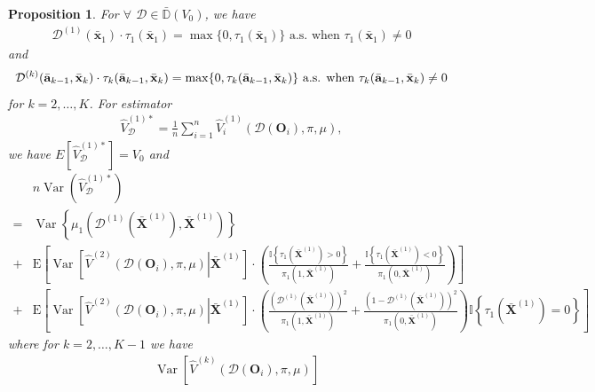 \documentclass[11pt]{article}
\theoremstyle{referenceplain}
\newtheorem{proposition}{Proposition}[section]
\theoremstyle{referencedefinition}
\theoremstyle{referenceremark}
\begin{document}
\begin{proposition}\label{multi-opt-oracle}
    For $\forall$ $\mathcal{D}\in\bar{\mathbb{D}}(V_0)$, we have 
    \begin{align*}
        \mathcal{D}^{(1)}(\bar{\mathbf{x}}_1)\cdot\tau_1(\bar{\mathbf{x}}_1)=\max\{0,\tau_1(\bar{\mathbf{x}}_1)\} \text{ a.s. when }\tau_1(\bar{\mathbf{x}}_1)\neq0
    \end{align*}
    and
    \begin{align*}
         \mathcal{D}^{(k)}(\Bar{\mathbf{a}}_{k-1},\bar{\mathbf{x}}_k)\cdot\tau_k(\Bar{\mathbf{a}}_{k-1},\bar{\mathbf{x}}_k)=\max\{0,\tau_k(\Bar{\mathbf{a}}_{k-1},\bar{\mathbf{x}}_k)\} \text{ a.s. when }\tau_k(\Bar{\mathbf{a}}_{k-1},\bar{\mathbf{x}}_k)\neq0
    \end{align*}
    for $k=2,\dots,K$. For estimator 
    \begin{align*}
        \widehat{V}_{\mathcal{D}}^{(1)*}=\frac{1}{n}\sum_{i=1}^n \widehat{V}_i^{(1)}(\mathcal{D}(\mathbf{O}_i),\pi,\mu),
    \end{align*}
    we have $E[\widehat{V}_{\mathcal{D}}^{(1)*}]=V_0$ and 
    \begin{align*}
        &n\operatorname{Var}\left(\widehat{V}_{\mathcal{D}}^{(1)*}\right)\\
        = &  \operatorname{Var}\left\{\mu_1\left(\mathcal{D}^{(1)}(\bar{\mathbf{X}}^{(1)}), \bar{\mathbf{X}}^{(1)}\right)\right\}\\
        +& \mathrm{E}\left[\operatorname{Var}\left[\widehat{V}^{(2)}(\mathcal{D}(\mathbf{O}_i),\pi,\mu)\left|\bar{\mathbf{X}}^{(1)}\right.\right]\cdot\left(\frac{\mathbb{I}\left\{\tau_1\left(\bar{\mathbf{X}}^{(1)}\right)>0\right\}}{\pi_1\left(1, \bar{\mathbf{X}}^{(1)}\right)}+\frac{\mathbb{I}\left\{\tau_1\left(\bar{\mathbf{X}}^{(1)}\right)<0\right\}}{\pi_1\left(0, \bar{\mathbf{X}}^{(1)}\right)}\right)\right]\\
    +&\mathrm{E}\left[\operatorname{Var}\left[\widehat{V}^{(2)}(\mathcal{D}(\mathbf{O}_i),\pi,\mu)\left|\bar{\mathbf{X}}^{(1)}\right.\right]\cdot\left(\frac{(\mathcal{D}^{(1)}(\bar{\mathbf{X}}^{(1)}))^2}{\pi_1\left(1, \bar{\mathbf{X}}^{(1)}\right)}+\frac{(1-\mathcal{D}^{(1)}(\bar{\mathbf{X}}^{(1)}))^2}{\pi_1\left(0, \bar{\mathbf{X}}^{(1)}\right)}\right) \mathbb{I}\left\{\tau_1\left(\bar{\mathbf{X}}^{(1)}\right)=0\right\}\right]
    \end{align*}
    where for $k=2,\dots,K-1$ we have
     \begin{align*}
 &\operatorname{Var}\left[\widehat{V}^{(k)}(\mathcal{D}(\mathbf{O}_i),\pi,\mu)\right]\\

\end{align*}
\end{proposition}
\end{document}
